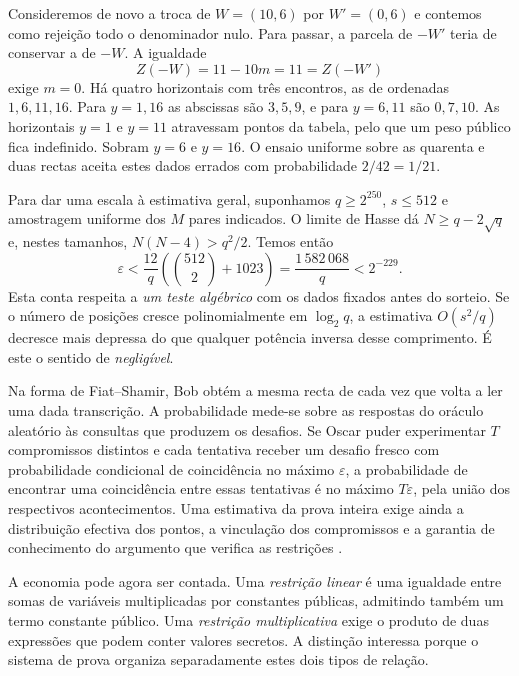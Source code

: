 Consideremos de novo a troca de \(W=(10,6)\) por \(W'=(0,6)\)
e contemos como rejeição todo o denominador nulo. Para passar, a parcela
de \(-W'\) teria de conservar a de \(-W\). A igualdade
\[
 Z(-W)=11-10m=11=Z(-W')
\]
exige \(m=0\). Há quatro horizontais com três encontros, as de
ordenadas \(1,6,11,16\). Para \(y=1,16\) as abscissas são
\(3,5,9\), e para \(y=6,11\) são \(0,7,10\). As horizontais
\(y=1\) e \(y=11\) atravessam pontos da tabela, pelo que um peso
público fica indefinido. Sobram \(y=6\) e \(y=16\). O ensaio
uniforme sobre as quarenta e duas rectas aceita estes dados errados
com probabilidade \(2/42=1/21\).

Para dar uma escala à estimativa geral, suponhamos
\(q\geq2^{250}\), \(s\leq512\) e amostragem uniforme dos \(M\)
pares indicados. O limite de Hasse dá \(N\geq q-2\sqrt q\) e,
nestes tamanhos, \(N(N-4)>q^2/2\). Temos então
\[
 \varepsilon
 <\frac{12}{q}\left(\binom{512}{2}+1023\right)
 =\frac{1\,582\,068}{q}<2^{-229}.
\]
Esta conta respeita a \emph{um teste algébrico} com os dados fixados
antes do sorteio. Se o número de posições cresce polinomialmente em
\(\log_2 q\), a estimativa \(O(s^2/q)\) decresce mais depressa do que
qualquer potência inversa desse comprimento. É este o sentido de
\emph{negligível}.

Na forma de Fiat--Shamir, Bob obtém a mesma recta de cada vez que
volta a ler uma dada transcrição. A probabilidade mede-se sobre as
respostas do oráculo aleatório às consultas que produzem os desafios.
Se Oscar puder experimentar \(T\) compromissos distintos e cada
tentativa receber um desafio fresco com probabilidade condicional de
coincidência no máximo \(\varepsilon\), a probabilidade de encontrar
uma coincidência entre essas tentativas é no máximo
\(T\varepsilon\), pela união dos respectivos acontecimentos.
Uma estimativa da prova inteira exige ainda a distribuição efectiva
dos pontos, a vinculação dos compromissos e a garantia de conhecimento
do argumento que verifica as restrições
\cite{eagen-divisors,generalized-bulletproofs-fixed}.


A economia pode agora ser contada. Uma \emph{restrição linear} é
uma igualdade entre somas de variáveis multiplicadas por constantes
públicas, admitindo também um termo constante público.
Uma \emph{restrição multiplicativa} exige o produto de
duas expressões que podem conter valores secretos. A distinção
interessa porque o sistema de prova organiza separadamente estes
dois tipos de relação.

